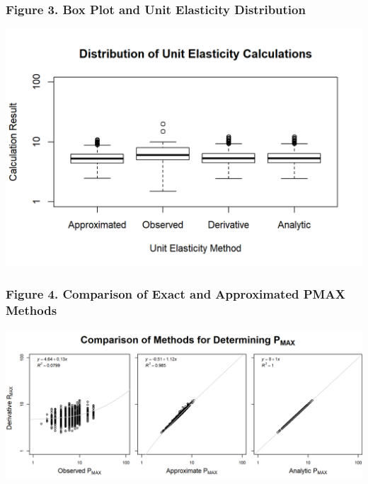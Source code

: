 \documentclass[]{article}
\begin{document}
\subsubsection{Figure 3. Box Plot and Unit Elasticity
Distribution}\label{figure-3.-box-plot-and-unit-elasticity-distribution}

\begin{center}\includegraphics{plots/Figure_3-1} \end{center}

\subsubsection{Figure 4. Comparison of Exact and Approximated PMAX
Methods}\label{figure-4.-comparison-of-exact-and-approximated-pmax-methods}

\begin{center}\includegraphics{plots/Figure_4-1} \end{center}
\end{document}
